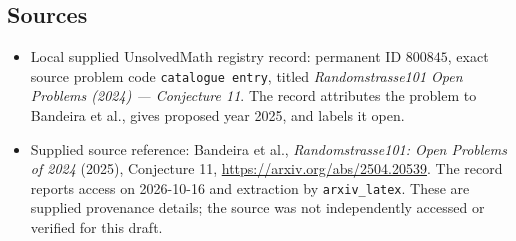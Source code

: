 \documentclass[11pt]{article}
\begin{document}
\subsection{Sources}
\begin{itemize}
\item Local supplied UnsolvedMath registry record: permanent ID \(800845\), exact source problem code \texttt{catalogue entry}, titled \emph{Randomstrasse101 Open Problems (2024) --- Conjecture 11}. The record attributes the problem to Bandeira et al., gives proposed year 2025, and labels it open.
\item Supplied source reference: Bandeira et al., \emph{Randomstrasse101: Open Problems of 2024} (2025), Conjecture 11, \url{https://arxiv.org/abs/2504.20539}. The record reports access on 2026-10-16 and extraction by \texttt{arxiv\_latex}. These are supplied provenance details; the source was not independently accessed or verified for this draft.
\end{itemize}
\end{document}

